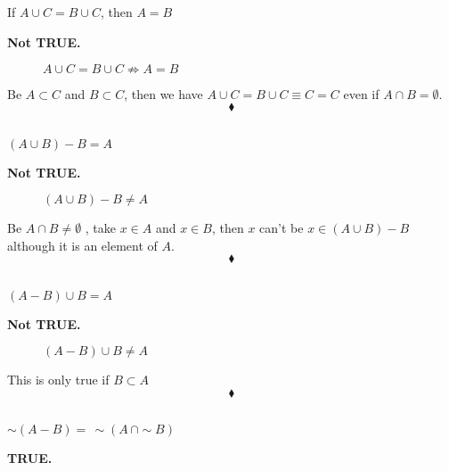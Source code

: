 \subsection{}
\begin{tcolorbox}
If $A\cup C=B\cup C$, then $A=B$
\end{tcolorbox}
\textbf{Not TRUE.}\\
\begin{figure}[H]%
    \centering
    
\caption{$A\cup C=B\cup C\not\Rightarrow A=B$}
\label{fig:fig_p8b}
\end{figure}
Be $A\subset C$ and $B\subset C$, then we have $A\cup C=B\cup C\equiv C=C$ even if $A\cap B=\emptyset$.
$$\blacklozenge$$

\subsection{}
\begin{tcolorbox}
$(A\cup B)-B=A$
\end{tcolorbox}
\textbf{Not TRUE.}\\
\begin{figure}[H]%
    \centering
    
\caption{$(A\cup B)-B\ne A$ }
\label{fig:fig_p8b}
\end{figure}
Be $A\cap B\neq \emptyset$ , take  $x\in A$ and $x\in B$, then $x$ can't be $x\in (A\cup B)-B$ although it is an element of $A$.
$$\blacklozenge$$

\subsection{}
\begin{tcolorbox}
$(A- B)\cup B=A$
\end{tcolorbox}
\textbf{Not TRUE.}\\
\begin{figure}[H]%
    \centering
    
\caption{$(A- B)\cup B\ne A$ }
\label{fig:fig_p8b}
\end{figure}
This is only true if $B\subset A$
$$\blacklozenge$$


\subsection{}
\begin{tcolorbox}
$\sim(A-B)=\, \sim(A\, \cap \sim B)$
\end{tcolorbox}
\textbf{ TRUE.}\\

